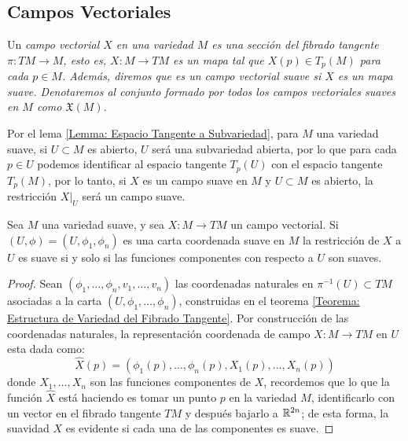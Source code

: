 \subsection{Campos Vectoriales}\label{Subsección: Campos Vectoriales}
\begin{definition}
	Un \it{campo vectorial} $X$ en una variedad $M$ es una sección del fibrado tangente $\pi: TM \to M$, esto es, $X: M \to TM$ es un mapa tal que $X(p) \in T_{p}(M)$ para cada $p \in M$. Además, diremos que es un \it{campo vectorial suave} si $X$ es un mapa suave. Denotaremos al conjunto formado por todos los campos vectoriales suaves en $M$ como $\mathfrak{X}(M)$.
\end{definition}

Por el lema \ref{Lemma: Espacio Tangente a Subvariedad}, para $M$ una variedad suave, si $U \subset M$ es abierto, $U$ será una subvariedad abierta, por lo que para cada $p \in U$ podemos identificar al espacio tangente $T_p(U)$ con el espacio tangente $T_p(M)$, por lo tanto, si $X$ es un campo suave en $M$ y $U \subset M$ es abierto, la restricción $X|_{U}$ será un campo suave.

\begin{theorem}\label{Teorema: Primer Criterio de Suavidad Para Campos Vectoriales}
	Sea $M$ una variedad suave, y sea $X: M \to TM$ un campo vectorial. Si $(U,\phi) = (U,\phi_1,\phi_n)$ es una carta coordenada suave en $M$ la restricción de $X$ a $U$ es suave si y solo si las funciones componentes con respecto a $U$ son suaves.
\end{theorem}

\begin{proof}
	Sean $(\phi_1,\ldots,\phi_n, v_1, \ldots, v_n)$ las coordenadas naturales en $\pi^{-1}(U) \subset TM$ asociadas a la carta $(U,\phi_1,\ldots,\phi_n)$, construidas en el teorema \ref{Teorema: Estructura de Variedad del Fibrado Tangente}. Por construcción de las coordenadas naturales, la representación coordenada de campo $X: M \to TM$ en $U$ esta dada como:
	\[
		\hat{X}(p) = (\phi_1(p), \ldots, \phi_n(p), X_1(p), \ldots, X_n(p))
	\]
	donde $X_1, \ldots, X_n$ son las funciones componentes de $X$, recordemos que lo que la función $\hat{X}$ está haciendo es tomar un punto $p$ en la variedad $M$, identificarlo con un vector en el fibrado tangente $TM$ y después bajarlo a $\mathbb{R}^{2n}$; de esta forma, la suavidad $X$ es evidente si cada una de las componentes es suave.
\end{proof}

